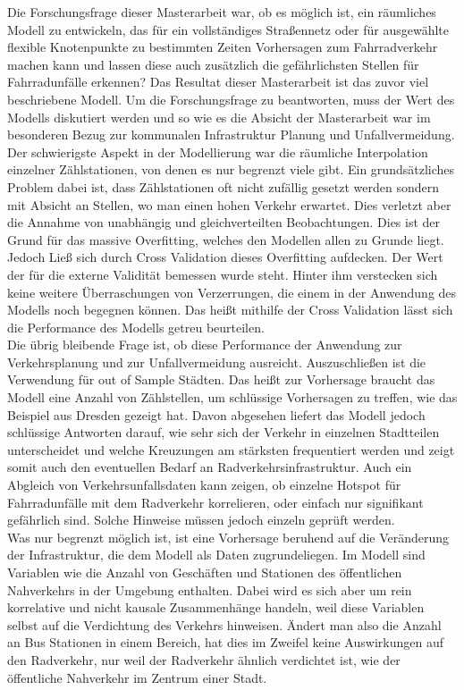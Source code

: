 \documentclass[a4paper,12pt]{thesis}
\begin{document}
Die Forschungsfrage dieser Masterarbeit war, ob es möglich ist, ein räumliches Modell zu entwickeln, das für ein vollständiges Straßennetz oder für ausgewählte flexible Knotenpunkte zu bestimmten Zeiten Vorhersagen zum Fahrradverkehr machen kann und lassen diese auch zusätzlich die gefährlichsten Stellen für Fahrradunfälle erkennen? Das Resultat dieser Masterarbeit ist das zuvor viel beschriebene Modell. Um die Forschungsfrage zu beantworten, muss der Wert des Modells diskutiert werden und so wie es die Absicht der Masterarbeit war im besonderen Bezug zur kommunalen Infrastruktur Planung und Unfallvermeidung.\\
Der schwierigste Aspekt in der Modellierung war die räumliche Interpolation einzelner Zählstationen, von denen es nur begrenzt viele gibt. Ein grundsätzliches Problem dabei ist, dass Zählstationen oft nicht zufällig gesetzt werden sondern mit Absicht an Stellen, wo man einen hohen Verkehr erwartet. Dies verletzt aber die Annahme von unabhängig und gleichverteilten Beobachtungen. Dies ist der Grund für das massive Overfitting, welches den Modellen allen zu Grunde liegt. Jedoch Ließ sich durch Cross Validation dieses Overfitting aufdecken. Der Wert der für die externe Validität bemessen wurde steht. Hinter ihm verstecken sich keine weitere Überraschungen von Verzerrungen, die einem in der Anwendung des Modells noch begegnen können. Das heißt mithilfe der Cross Validation lässt sich die Performance des Modells getreu beurteilen.\\
Die übrig bleibende Frage ist, ob diese Performance der Anwendung zur Verkehrsplanung und zur Unfallvermeidung ausreicht. Auszuschließen ist die Verwendung für out of Sample Städten. Das heißt zur Vorhersage braucht das Modell eine Anzahl von Zählstellen, um schlüssige Vorhersagen zu treffen, wie das Beispiel aus Dresden gezeigt hat. Davon abgesehen liefert das Modell jedoch schlüssige Antworten darauf, wie sehr sich der Verkehr in einzelnen Stadtteilen unterscheidet und welche Kreuzungen am stärksten frequentiert werden und zeigt somit auch den eventuellen Bedarf an Radverkehrsinfrastruktur. Auch ein Abgleich von Verkehrsunfallsdaten kann zeigen, ob einzelne Hotspot für Fahrradunfälle mit dem Radverkehr korrelieren, oder einfach nur signifikant gefährlich sind. Solche Hinweise müssen jedoch einzeln geprüft werden.\\
Was nur begrenzt möglich ist, ist eine Vorhersage beruhend auf die Veränderung der Infrastruktur, die dem Modell als Daten zugrundeliegen. Im Modell sind Variablen wie die Anzahl von Geschäften und Stationen des öffentlichen Nahverkehrs in der Umgebung enthalten. Dabei wird es sich aber um rein korrelative und nicht kausale Zusammenhänge handeln, weil diese Variablen selbst auf die Verdichtung des Verkehrs hinweisen. Ändert man also die Anzahl an Bus Stationen in einem Bereich, hat dies im Zweifel keine Auswirkungen auf den Radverkehr, nur  weil der Radverkehr ähnlich verdichtet ist, wie der öffentliche Nahverkehr im Zentrum einer Stadt.\\
\end{document}
